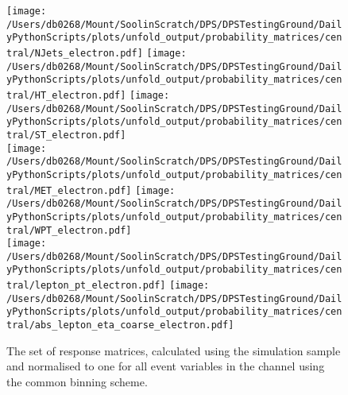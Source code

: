 \begin{figure}[hp]
	\centering
	\texttt{[image: /Users/db0268/Mount/SoolinScratch/DPS/DPSTestingGround/DailyPythonScripts/plots/unfold\_output/probability\_matrices/central/NJets\_electron.pdf]}
	\texttt{[image: /Users/db0268/Mount/SoolinScratch/DPS/DPSTestingGround/DailyPythonScripts/plots/unfold\_output/probability\_matrices/central/HT\_electron.pdf]}
	\texttt{[image: /Users/db0268/Mount/SoolinScratch/DPS/DPSTestingGround/DailyPythonScripts/plots/unfold\_output/probability\_matrices/central/ST\_electron.pdf]}\\
	\texttt{[image: /Users/db0268/Mount/SoolinScratch/DPS/DPSTestingGround/DailyPythonScripts/plots/unfold\_output/probability\_matrices/central/MET\_electron.pdf]}
	\texttt{[image: /Users/db0268/Mount/SoolinScratch/DPS/DPSTestingGround/DailyPythonScripts/plots/unfold\_output/probability\_matrices/central/WPT\_electron.pdf]} \\
	\texttt{[image: /Users/db0268/Mount/SoolinScratch/DPS/DPSTestingGround/DailyPythonScripts/plots/unfold\_output/probability\_matrices/central/lepton\_pt\_electron.pdf]}
	\texttt{[image: /Users/db0268/Mount/SoolinScratch/DPS/DPSTestingGround/DailyPythonScripts/plots/unfold\_output/probability\_matrices/central/abs\_lepton\_eta\_coarse\_electron.pdf]}
	\caption[The set of response matrices, calculated using the \powhegpythia{} simulation sample and normalised to one for all event variables in the \eJets{} channel using the common binning scheme.]{The set of response matrices, calculated using the \powhegpythia{} simulation sample and normalised to one for all event variables in the \eJets{} channel using the common binning scheme.}
	\label{fig:ResponseMatricesE}
\end{figure}

